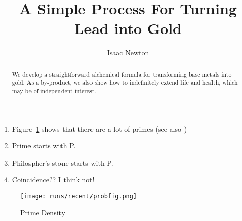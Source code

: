 \documentclass{article}
\title{A Simple Process For Turning Lead into Gold}
\author{Isaac Newton}
\date{}
\begin{document}
\maketitle
\begin{abstract}
We develop a straightforward alchemical formula for transforming base metals into gold. 
As a by-product, we also show how to indefinitely extend life and health, which may be of independent interest.
\end{abstract}


\begin{enumerate}
\item Figure~\ref{fig:primes} shows that there are a lot of primes (see also \cite{newman1980simple})
\item Prime starts with P.
\item Philospher's stone starts with P.
\item Coincidence?? I think not!
\end{enumerate}
\begin{figure}[h!]
\centering
\texttt{[image: runs/recent/probfig.png]}
    \caption{Prime Density}\label{fig:primes}
\end{figure}

\printbibliography
\end{document}
